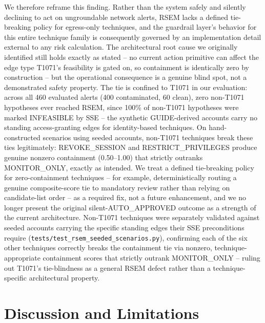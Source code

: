 \documentclass[conference]{IEEEtran}
\begin{document}
We therefore reframe this finding. Rather than the system safely and silently declining to act on ungroundable network alerts, RSEM lacks a defined tie-breaking policy for egress-only techniques, and the guardrail layer's behavior for this entire technique family is consequently governed by an implementation detail external to any risk calculation. The architectural root cause we originally identified still holds exactly as stated -- no current action primitive can affect the edge type T1071's feasibility is gated on, so containment is identically zero by construction -- but the operational consequence is a genuine blind spot, not a demonstrated safety property. The tie is confined to T1071 in our evaluation: across all 460 evaluated alerts (400 contaminated, 60 clean), zero non-T1071 hypotheses ever reached RSEM, since 100\% of non-T1071 hypotheses were marked INFEASIBLE by SSE -- the synthetic GUIDE-derived accounts carry no standing access-granting edges for identity-based techniques. On hand-constructed scenarios using seeded accounts, non-T1071 techniques break these ties legitimately: REVOKE\_SESSION and RESTRICT\_PRIVILEGES produce genuine nonzero containment (0.50--1.00) that strictly outranks MONITOR\_ONLY, exactly as intended. We treat a defined tie-breaking policy for zero-containment techniques -- for example, deterministically routing a genuine composite-score tie to mandatory review rather than relying on candidate-list order -- as a required fix, not a future enhancement, and we no longer present the original silent-AUTO\_APPROVED outcome as a strength of the current architecture. Non-T1071 techniques were separately validated against seeded accounts carrying the specific standing edges their SSE preconditions require (\texttt{tests/test\_rsem\_seeded\_scenarios.py}), confirming each of the six other techniques correctly breaks the containment tie via nonzero, technique-appropriate containment scores that strictly outrank MONITOR\_ONLY -- ruling out T1071's tie-blindness as a general RSEM defect rather than a technique-specific architectural property.

\section{Discussion and Limitations}
\label{sec:discussion}
\end{document}
